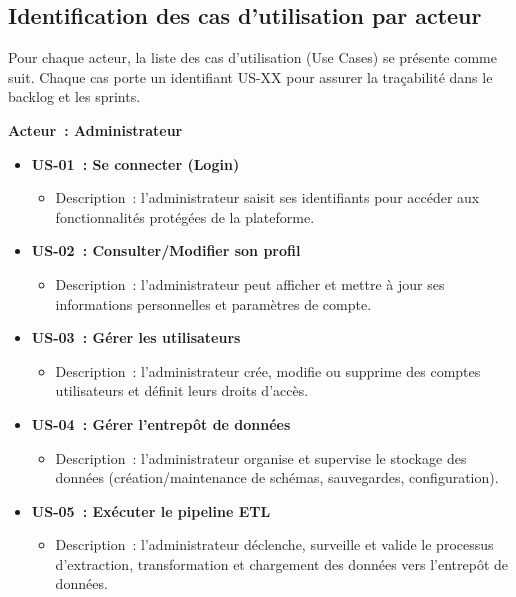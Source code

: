 \documentclass[12pt,a4paper]{report}
\begin{document}
\subsection{Identification des cas d’utilisation par acteur}
Pour chaque acteur, la liste des cas d’utilisation (Use Cases) se présente comme suit. Chaque cas porte un identifiant US-XX pour assurer la traçabilité dans le backlog et les sprints.

\medskip
\noindent\textbf{Acteur : Administrateur}
\begin{itemize}
  \item \textbf{US-01 : Se connecter (Login)}  
    \begin{itemize}
      \item Description : l’administrateur saisit ses identifiants pour accéder aux fonctionnalités protégées de la plateforme.
    \end{itemize}
  \item \textbf{US-02 : Consulter/Modifier son profil}  
    \begin{itemize}
      \item Description : l’administrateur peut afficher et mettre à jour ses informations personnelles et paramètres de compte.
    \end{itemize}
  \item \textbf{US-03 : Gérer les utilisateurs}  
    \begin{itemize}
      \item Description : l’administrateur crée, modifie ou supprime des comptes utilisateurs et définit leurs droits d’accès.
    \end{itemize}
  \item \textbf{US-04 : Gérer l’entrepôt de données}  
    \begin{itemize}
      \item Description : l’administrateur organise et supervise le stockage des données (création/maintenance de schémas, sauvegardes, configuration).
    \end{itemize}
  \item \textbf{US-05 : Exécuter le pipeline ETL}  
    \begin{itemize}
      \item Description : l’administrateur déclenche, surveille et valide le processus d’extraction, transformation et chargement des données vers l’entrepôt de données.
    \end{itemize}

\end{itemize}
\end{document}
